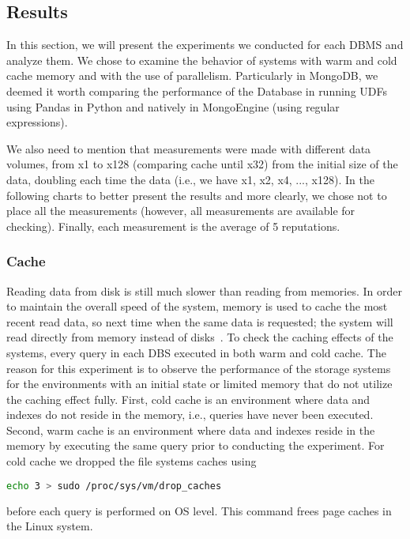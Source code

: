 \subsection{Results}

In this section, we will present the experiments we conducted for each DBMS and analyze them. 
We chose to examine the behavior of systems with warm and cold cache memory and with the use of parallelism. 
Particularly in MongoDB, we deemed it worth comparing the performance of the Database in running UDFs using 
Pandas in Python and natively in MongoEngine (using regular expressions).

We also need to mention that measurements were made with different data volumes, 
from x1 to x128 (comparing cache until x32) from the initial size of the data, 
doubling each time the data (i.e., we have x1, x2, x4, ..., x128). 
In the following charts to better present the results and more clearly, we chose not to place all the measurements 
(however, all measurements are available for checking). Finally, each measurement is the average of 5 reputations.

\subsubsection{Cache}
Reading data from disk is still much slower than reading from memories. In
order to maintain the overall speed of the system, memory is used to cache the most
recent read data, so next time when the same data is requested; the system will read
directly from memory instead of disks~\cite{Smit82}. 
To check the caching effects of the systems, every query in each DBS executed in both warm and cold cache. 
The reason for this experiment is to observe the performance of the storage systems for the environments 
with an initial state or limited memory that do not utilize the caching effect fully. 
First, cold cache is an environment where data and indexes do not reside in the memory, i.e., queries have
never been executed. 
Second, warm cache is an environment where data and indexes
reside in the memory by executing the same query prior to conducting the experiment. 
For cold cache we dropped the file systems caches using
\begin{lstlisting}[language=bash, caption= {UNIX Commands for clean cache}, label={lst:paralDF}]
	echo 3 > sudo /proc/sys/vm/drop_caches
\end{lstlisting} 
before each query is performed on OS level. 
This command frees page caches in the Linux system. 

